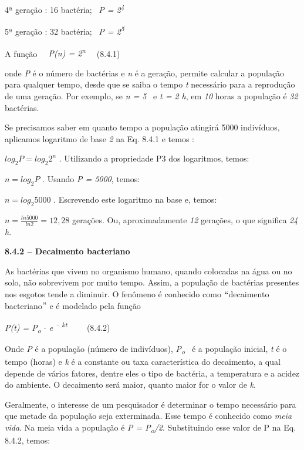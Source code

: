 4ª geração : 16 bactéria;~ \textit{P = 2\textsuperscript{4}}

5ª geração : 32 bactéria;~ \textit{P = 2\textsuperscript{5}}

A função\textit{~~ P(n) = 2\textsuperscript{n}~~ \quad \quad \quad \quad \quad \quad \quad \quad }(8.4.1)

onde \textit{P} é o número de bactérias e \textit{n }é a geração, permite calcular a população para qualquer tempo, desde que se saiba o tempo \textit{t} necessário para a reprodução de uma geração. Por exemplo, se \textit{n = 5}~ e \textit{t = 2 h}, em \textit{10} horas a população é \textit{32} bactérias. 

Se precisamos saber em quanto tempo a população atingirá 5000 indivíduos, aplicamos logaritmo de base \textit{2} na Eq. 8.4.1 e temos :

\( log_{2}P=log_{2}2^{n} \) . Utilizando a propriedade P3 dos logaritmos, temos:

\( n=log_{2}P \) . Usando \textit{P = 5000}, temos:

\( n=log_{2}5000 \)  . Escrevendo este logaritmo na base e, temos:

\( n=\frac{ln5000}{ln2}=12,28 \)  gerações. Ou, aproximadamente \textit{12} gerações, o que significa \textit{24 h}.

{\fontsize{14pt}{16.8pt}\selectfont \textbf{8.4.2 – Decaimento bacteriano}}

As bactérias que vivem no organismo humano, quando colocadas na água ou no solo, não sobrevivem por muito tempo. Assim, a população de bactérias presentes nos esgotos tende a diminuir. O fenômeno é conhecido como $``$decaimento bacteriano$"$  e é modelado pela função 

\textit{P(t) = P\textsubscript{o} $ \cdot $  e \textsuperscript{– kt}}{\fontsize{14pt}{16.8pt}\selectfont \textit{~~~~ \quad \quad \quad \quad \quad \quad \quad }(8.4.2)}

Onde \textit{P} é a população (número de indivíduos), \textit{P\textsubscript{o}~ }é a população inicial, \textit{t} é o tempo (horas) e \textit{k} é a constante ou taxa característica do decaimento, a qual depende de vários fatores, dentre eles o tipo de bactéria, a temperatura e a acidez do ambiente. O decaimento será maior, quanto maior for o valor de \textit{k}. 

Geralmente, o interesse de um pesquisador é determinar o tempo necessário para que metade da população seja exterminada. Esse tempo é conhecido como \textit{meia vida}. Na meia vida a população é \textit{P = P\textsubscript{o}/2}. Substituindo esse valor de P na Eq. 8.4.2, temos:

